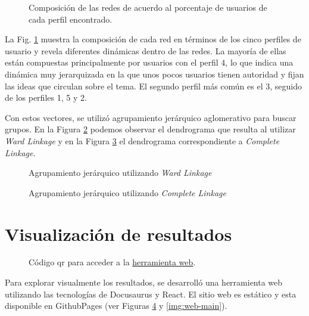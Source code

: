  \begin{figure}[htbp]
   \centering
   
    \caption{Composición de las redes de acuerdo al porcentaje de usuarios de cada perfil encontrado.}
    \label{fig:composition}
\end{figure}

La Fig. \ref{fig:composition} muestra la composición de cada red en términos de los cinco perfiles de usuario y revela diferentes dinámicas dentro de las redes. La mayoría de ellas están compuestas principalmente por usuarios con el perfil 4, lo que indica una dinámica muy jerarquizada en la que unos pocos usuarios tienen autoridad y fijan las ideas que circulan sobre el tema. El segundo perfil más común es el 3, seguido de los perfiles 1, 5 y 2.

Con estos vectores, se utilizó agrupamiento jerárquico aglomerativo para buscar grupos. En la Figura \ref{fig:dendro-ward} podemos observar el dendrograma que resulta al utilizar \textit{Ward Linkage} y en la Figura \ref{fig:dendro-complete} el dendrograma correspondiente a \textit{Complete Linkage}.

 \begin{figure}[htbp]
   \centering
   
    \caption{Agrupamiento jerárquico utilizando \textit{Ward Linkage}}
    \label{fig:dendro-ward}
\end{figure}

 \begin{figure}[htbp]
   \centering
   
    \caption{Agrupamiento jerárquico utilizando \textit{Complete Linkage}}
    \label{fig:dendro-complete}
\end{figure}

\section{Visualización de resultados}
 \begin{figure}[htbp]
   \centering
   
    \caption{Código qr para acceder a la \href{https://roicort.github.io/OrbitalClustering}{herramienta web}.}
    \label{img:web-qr}
\end{figure}

Para explorar visualmente los resultados, se desarrolló una herramienta web utilizando las tecnologías de Docusaurus y React. El sitio web es estático y esta disponible en GithubPages (ver Figuras \ref{img:web-qr} y \ref{img:web-main}). 

